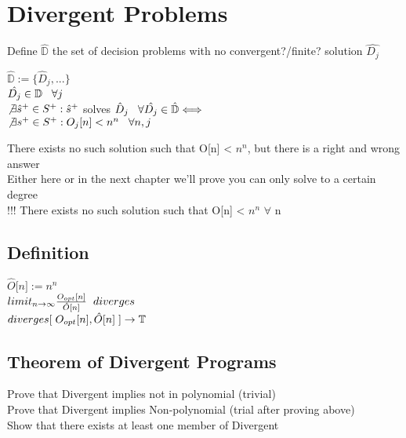 \documentclass[11pt]{article}
\begin{document}
\section{Divergent Problems}
Define $\hat{\mathbb{D}}$ the set of decision problems with no convergent?/finite? solution $\hat{D_j}$\\
\begin{center}
$
\hat{\mathbb{D}} := \{\hat{D}_j,...\}
$
\\ \vspace{2mm}
$
\hat{D_j} \in \mathbb{D} \hspace{3mm} \forall j
$
\\ \vspace{2mm}
$
\not \exists \hat{s}^{+} \in S^{+} : \hat{s}^{+}$ solves $\hat{D}_j \hspace{3mm} \forall \hat{D_j} \in \hat{\mathbb{D}} \Longleftrightarrow 
$
\\
$
\not \exists s^{+} \in S^{+} : O_j \lbrack n \rbrack < n^n  \hspace{3mm} \forall n,j
$
\end{center}
There exists no such solution such that O[n] < $n^n$, but there is a right and wrong answer\\
Either here or in the next chapter we'll prove you can only solve to a certain degree\\
 !!! There exists no such solution such that O[n] < $n^n$ \hspace{3mm} $\forall$ n
 
 \subsection{Definition}
 \begin{center}
$
\hat{O} \lbrack n \rbrack := n^n
$
\\ \vspace{2mm}
$
limit_{n \rightarrow \infty}\frac {O_{opt} \lbrack n \rbrack}{\hat{O}\lbrack n \rbrack} \hspace{2mm} diverges
$
\\ \vspace{2mm}
$
diverges \lbrack \hspace{1mm} O_{opt} \lbrack n \rbrack, \hat{O}\lbrack n \rbrack \hspace{1mm} \rbrack \rightarrow \mathbb{T}
$
\end{center}

\subsection{Theorem of Divergent Programs}
Prove that Divergent implies not in polynomial (trivial)\\
Prove that Divergent implies Non-polynomial (trial after proving above)\\
Show that there exists at least one member of Divergent\\
\end{document}
